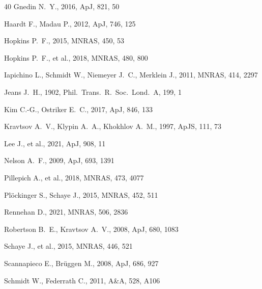 \documentclass[fleqn,usenatbib]{mnras}
\begin{document}
\begin{thebibliography}{40}
Gnedin N.~Y., 2016, ApJ, 821, 50

Haardt F., Madau P., 2012, ApJ, 746, 125

Hopkins P.~F., 2015, MNRAS, 450, 53

Hopkins P.~F., et al., 2018, MNRAS, 480, 800

Iapichino L., Schmidt W., Niemeyer J.~C., Merklein J., 2011, MNRAS, 414,
2297

Jeans J.~H., 1902, Phil.\ Trans.\ R.\ Soc.\ Lond.\ A, 199, 1

Kim C.-G., Ostriker E.~C., 2017, ApJ, 846, 133

Kravtsov A.~V., Klypin A.~A., Khokhlov A.~M., 1997, ApJS, 111, 73

Lee J., et al., 2021, ApJ, 908, 11

Nelson A.~F., 2009, ApJ, 693, 1391

Pillepich A., et al., 2018, MNRAS, 473, 4077

Pl\"ockinger S., Schaye J., 2015, MNRAS, 452, 511

Rennehan D., 2021, MNRAS, 506, 2836

Robertson B.~E., Kravtsov A.~V., 2008, ApJ, 680, 1083

Schaye J., et al., 2015, MNRAS, 446, 521

Scannapieco E., Br\"uggen M., 2008, ApJ, 686, 927

Schmidt W., Federrath C., 2011, A\&A, 528, A106


\end{thebibliography}
\end{document}
